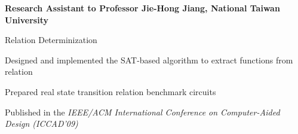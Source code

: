 \begin{myexp}
\item \textbf{Research Assistant to Professor Jie-Hong Jiang, National Taiwan University}   
  \begin{myexp}
    
     \item Relation Determinization
    \begin{mybullet}
    \item Designed and implemented the SAT-based algorithm to extract functions from relation
    \item Prepared real state transition relation benchmark circuits
    \item Published in the {\it IEEE/ACM International Conference on Computer-Aided Design (ICCAD'09)}
    \end{mybullet}
    

\end{myexp}
\end{myexp}
